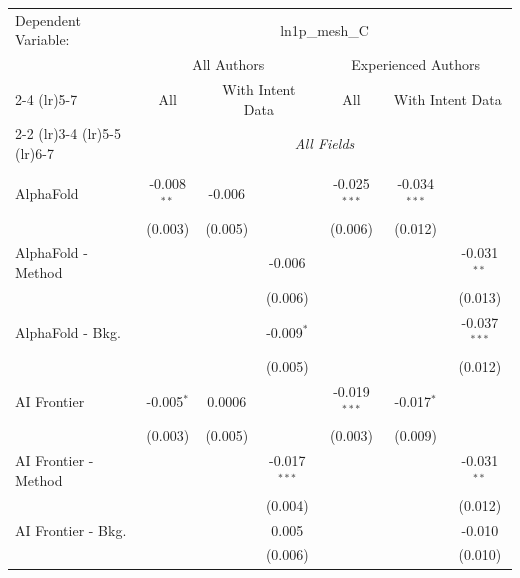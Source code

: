 \begingroup
\centering
\begin{tabular}{lcccccc}
   \tabularnewline \midrule \midrule
   Dependent Variable: & \multicolumn{6}{c}{ln1p\_mesh\_C}\\
 & \multicolumn{3}{c}{All Authors} & \multicolumn{3}{c}{Experienced Authors} \\
\cmidrule(lr){2-4} \cmidrule(lr){5-7}
 & \multicolumn{1}{c}{All} & \multicolumn{2}{c}{With Intent Data} & \multicolumn{1}{c}{All} & \multicolumn{2}{c}{With Intent Data} \\
\cmidrule(lr){2-2} \cmidrule(lr){3-4} \cmidrule(lr){5-5} \cmidrule(lr){6-7}
 & \multicolumn{6}{c}{\textit{All Fields}} \\ \\
   AlphaFold            & -0.008$^{**}$ & -0.006        &                & -0.025$^{***}$ & -0.034$^{***}$ &   \\   
                        & (0.003)       & (0.005)       &                & (0.006)        & (0.012)        &   \\   
   AlphaFold - Method   &               &               & -0.006         &                &                & -0.031$^{**}$\\   
                        &               &               & (0.006)        &                &                & (0.013)\\   
   AlphaFold - Bkg.     &               &               & -0.009$^{*}$   &                &                & -0.037$^{***}$\\   
                        &               &               & (0.005)        &                &                & (0.012)\\   
   AI Frontier          & -0.005$^{*}$  & 0.0006        &                & -0.019$^{***}$ & -0.017$^{*}$   &   \\   
                        & (0.003)       & (0.005)       &                & (0.003)        & (0.009)        &   \\   
   AI Frontier - Method &               &               & -0.017$^{***}$ &                &                & -0.031$^{**}$\\   
                        &               &               & (0.004)        &                &                & (0.012)\\   
   AI Frontier - Bkg.   &               &               & 0.005          &                &                & -0.010\\   
                        &               &               & (0.006)        &                &                & (0.010)\\   

\end{tabular}
